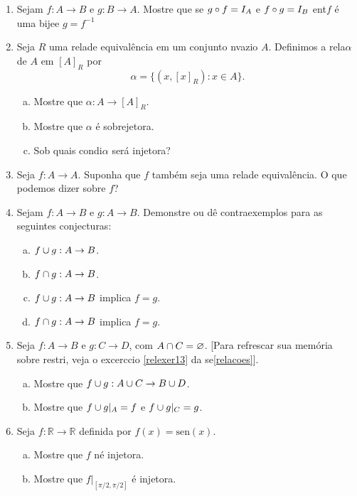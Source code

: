 \begin{enumerate}[{\bf 1.}]
\item Sejam $f:A\to B$ e $g:B\to A$. Mostre que se $g\circ f=I_A$ e $f\circ g=I_B$ ent\ao $f$ \'e uma bije\cao e $g=f^{-1}$

\item Seja $R$ uma rela\cao de equival\^encia em um conjunto n\ao vazio $A$. Definimos a rela\cao $\alpha$ de $A$ em $[A]_R$ por
\[
\alpha=\{(x,[x]_R): x\in A\}.
\]
\begin{enumerate}[a)]
\item Mostre que $\alpha:A\to [A]_R$.
\item Mostre que $\alpha$ \'e sobrejetora.
\item Sob quais condi\coes $\alpha$ ser\'a injetora?
\end{enumerate}

\item Seja $f:A\to A$. Suponha que $f$ tamb\'em seja uma rela\cao de equival\^encia. O que podemos dizer sobre $f$? 

\item Sejam $f:A\to B$ e $g:A\to B$. Demonstre ou d\^e contraexemplos para as seguintes conjecturas:
\begin{enumerate}[a)]
\item $f\cup g:A\to B$.
\item $f\cap g:A\to B$.
\item $f\cup g:A\to B$ implica $f=g$.
\item $f\cap g:A\to B$ implica $f=g$.
\end{enumerate}

\item Seja $f:A\to B$ e $g:C\to D$, com $A\cap C=\varnothing$. [Para refrescar sua mem\'oria sobre restri\cois, veja o excerc\ih cio \ref{relexer13} da se\cao \ref{relacoes}]. 
\begin{enumerate}[a)]
\item Mostre que $f\cup g:A\cup C\to B\cup D$.
\item Mostre que $f\cup g|_A=f$ e $f\cup g|_C=g$. 
\end{enumerate}

\item Seja $f:\mathbb{R}\to\mathbb{R}$ definida por $f(x)=\textrm{sen}(x).$
\begin{enumerate}[a)]
\item Mostre que $f$ n\ao \'e injetora.
\item Mostre que $f|_{[\pi/2,\pi/2]}$ \'e injetora.
\end{enumerate}


\end{enumerate}
